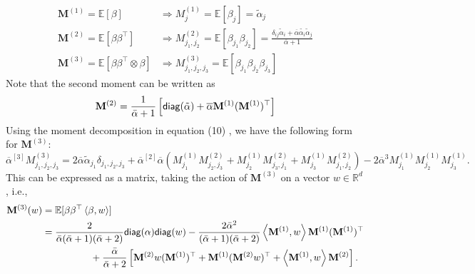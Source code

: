 \documentclass[bj,authoryear]{imsart}
\theoremstyle{plain}
\theoremstyle{remark}
\def\bM{\mathbf{M}}
\def\bbE{\mathbb{E}}
\def\bbR{\mathbb{R}}
\def\diag{{\sf diag}}
\newcommand{\innerprod}[1]{\left\langle#1\right\rangle}
\begin{document}
\begin{appendix}
\begin{align*}
    \bM^{(1)} = \bbE[\beta] &\Rightarrow M^{(1)}_j = \bbE[\beta_j] = \tilde{\alpha}_j \\
    \bM^{(2)} = \bbE[\beta\beta^\top] &\Rightarrow M^{(2)}_{j_1,j_2} = \bbE[\beta_{j_1}\beta_{j_2}] = \frac{\delta_{ij}\tilde{\alpha}_i + \overline{\alpha}\tilde{\alpha_i}\tilde{\alpha}_j}{\overline{\alpha}+1} \\
    \bM^{(3)} = \bbE[\beta\beta^\top\otimes \beta] &\Rightarrow M^{(3)}_{j_1,j_2,j_3} = \bbE[\beta_{j_1}\beta_{j_2}\beta_{j_3}]
\end{align*}
Note that the second moment can be written as
\begin{equation}\label{eq:2nd_moment_decomposition}
    \bM^{(2)} = \frac{1}{\bar{\alpha}+1}\left[\diag(\tilde{\alpha}) + \overline{\alpha} \bM^{(1)}(\bM^{(1)})^\top\right] 
\end{equation}
Using the moment decomposition in equation (10) \citep{do2025dirichlet}, we have the following form for $\bM^{(3)}$:
\begin{equation}
   \overline{\alpha}^{[3]} M^{(3)}_{j_1,j_2,j_3} = 2\overline{\alpha} \tilde{\alpha}_{j_1} \delta_{j_1,j_2,j_3} + \overline{\alpha}^{[2]}\overline{\alpha} \left(M^{(1)}_{j_1} M^{(2)}_{j_2,j_3}+M^{(1)}_{j_2} M^{(2)}_{j_3,j_1}+M^{(1)}_{j_3} M^{(2)}_{j_1,j_2}\right) - 2\overline{\alpha}^3 M^{(1)}_{j_1}M^{(1)}_{j_2}M^{(1)}_{j_3}.
\end{equation}
This can be expressed as a matrix, taking the action of $\bM^{(3)}$ on a vector $w\in \bbR^d$, i.e., 
\begin{equation}
    \begin{aligned}\label{eq:third_moment_dir}
        \bM^{(3)}(w) &= \bbE[\beta\beta^\top \innerprod{\beta,w}] \\
        &=\frac{2}{\bar{\alpha}(\bar{\alpha}+1)(\bar{\alpha}+2)} \diag(\alpha)\diag(w) - \frac{2\bar{\alpha}^2}{(\bar{\alpha}+1)(\bar{\alpha}+2)}\innerprod{\bM^{(1)},w} \bM^{(1)}(\bM^{(1)})^\top \\
        &\hspace{5em} + \frac{\bar{\alpha}}{\bar{\alpha}+2}\left[\bM^{(2)}w(\bM^{(1)})^\top + \bM^{(1)}(\bM^{(2)}w)^\top + \innerprod{\bM^{(1)}, w} \bM^{(2)}\right].
    \end{aligned}
\end{equation}


\end{appendix}
\end{document}
